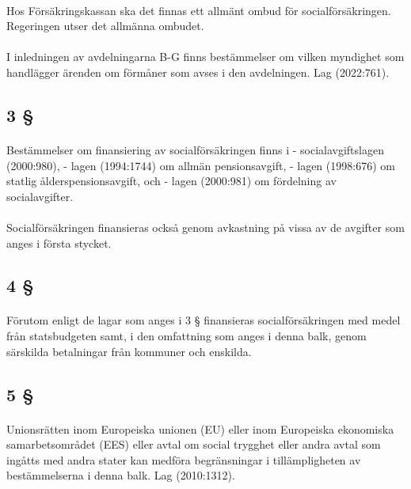 \documentclass[a4paper,notitlepage,openany,10pt]{book}
\begin{document}
\paragraph*{}
Hos Försäkringskassan ska det finnas ett allmänt ombud för socialförsäkringen. Regeringen utser det allmänna ombudet.
\paragraph*{}
I inledningen av avdelningarna B-G finns bestämmelser om vilken myndighet som handlägger ärenden om förmåner som avses i den avdelningen.
Lag (2022:761).
\subsection*{3 §}
\paragraph*{}
Bestämmelser om finansiering av socialförsäkringen finns i
\newline - socialavgiftslagen (2000:980),
\newline - lagen (1994:1744) om allmän pensionsavgift,
\newline - lagen (1998:676) om statlig ålderspensionsavgift, och
\newline - lagen (2000:981) om fördelning av socialavgifter.
\paragraph*{}
Socialförsäkringen finansieras också genom avkastning på vissa av de avgifter som anges i första stycket.
\subsection*{4 §}
\paragraph*{}
Förutom enligt de lagar som anges i 3 § finansieras socialförsäkringen med medel från statsbudgeten samt, i den omfattning som anges i denna balk, genom särskilda betalningar från kommuner och enskilda.
\subsection*{5 §}
\paragraph*{}
Unionsrätten inom Europeiska unionen (EU) eller inom Europeiska ekonomiska samarbetsområdet (EES) eller avtal om social trygghet eller andra avtal som ingåtts med andra stater kan medföra begränsningar i tillämpligheten av bestämmelserna i denna balk.
Lag (2010:1312).
\end{document}
